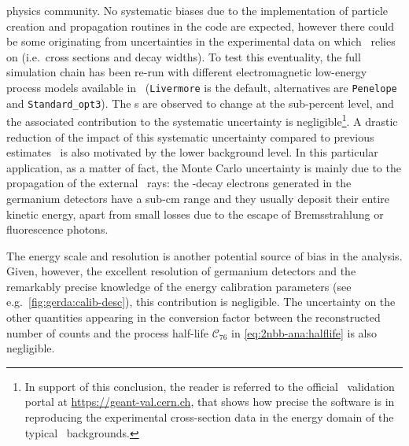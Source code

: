 \begin{description}[wide]
    physics community. No systematic biases due to the implementation of particle creation
    and propagation routines in the code are expected, however there could be some
    originating from uncertainties in the experimental data on which \geant\ relies on
    (i.e.~cross sections and decay widths). To test this eventuality, the full simulation
    chain has been re-run with different electromagnetic low-energy process models
    available in \geant\ (\texttt{Livermore} is the default, alternatives are
    \texttt{Penelope} and \texttt{Standard\_opt3}). The \pdf{}s are observed to change at the
    sub-percent level, and the associated contribution to the systematic uncertainty is
    negligible\footnote{%
      In support of this conclusion, the reader is referred to the official \geant\
      validation portal at \url{https://geant-val.cern.ch}, that shows how precise the
      software is in reproducing the experimental cross-section data in the energy domain
      of the typical \gerda\ backgrounds.
    }. A drastic reduction of the impact of this systematic uncertainty compared to
    previous estimates~\cite{Agostini2012a} is also motivated by the lower background
    level. In this particular application, as a matter of fact, the Monte Carlo
    uncertainty is mainly due to the propagation of the external \g\ rays: the \nnbb-decay
    electrons generated in the germanium detectors have a sub-cm range and they usually
    deposit their entire kinetic energy, apart from small losses due to the escape of
    Bremsstrahlung or fluorescence photons.

  \item[Other sources] The energy scale and resolution is another potential source of
    bias in the analysis. Given, however, the excellent resolution of germanium detectors
    and the remarkably precise knowledge of the energy calibration parameters (see
    e.g.~\cref{fig:gerda:calib-desc}), this contribution is negligible. The uncertainty on
    the other quantities appearing in the conversion factor between the reconstructed
    number of counts and the process half-life $\mathcal{C}_{76}$ in
    \cref{eq:2nbb-ana:halflife} is also negligible.

\end{description}

